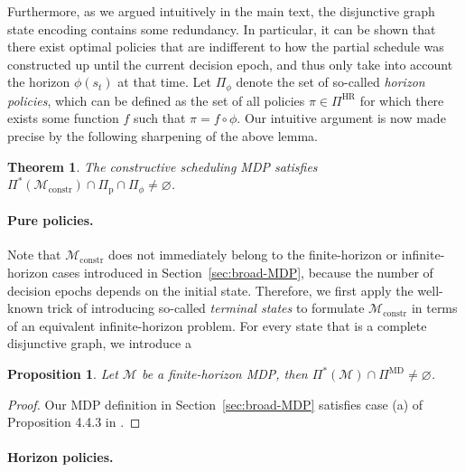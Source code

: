 \documentclass[11pt,a4paper]{article}
\newtheorem{theorem}{Theorem}[section]
\newtheorem{proposition}{Proposition}[section]
\theoremstyle{remark}
\begin{document}
Furthermore, as we argued intuitively in the main text, the disjunctive graph
state encoding contains some redundancy. In particular, it can be shown that
there exist optimal policies that are indifferent to how the partial schedule
was constructed up until the current decision epoch, and thus only take into
account the horizon $\phi(s_t)$ at that time.
%
Let $\Pi_\phi$ denote the set of so-called \emph{horizon policies}, which can be
defined as the set of all policies $\pi \in \Pi^\mathrm{HR}$ for which there
exists some function $f$ such that $\pi = f \circ \phi$.
%
Our intuitive argument is now made precise by the following sharpening of the
above lemma.

\begin{theorem}
  The constructive scheduling MDP satisfies
  $\Pi^*(\mathcal{M}_\mathrm{constr}) \cap \Pi_\mathrm{p} \cap \Pi_\phi \neq \varnothing$.

\end{theorem}

\paragraph{Pure policies.}
Note that $\mathcal{M}_\mathrm{constr}$ does not immediately belong to the
finite-horizon or infinite-horizon cases introduced in
Section~\ref{sec:broad-MDP}, because the number of decision epochs depends on
the initial state.
%
Therefore, we first apply the well-known trick of introducing so-called
\emph{terminal states} to formulate $\mathcal{M}_\mathrm{constr}$ in terms of an
equivalent infinite-horizon problem.
%
For every state that is a complete disjunctive graph, we introduce a

\begin{proposition}
  Let $\mathcal{M}$ be a finite-horizon MDP, then
  $\Pi^*(\mathcal{M}) \cap \Pi^\mathrm{MD} \neq \varnothing$.
\end{proposition}
\begin{proof}
  Our MDP definition in Section~\ref{sec:broad-MDP} satisfies case (a) of
  Proposition 4.4.3 in \cite{putermanMarkovDecisionProcesses2009}.
\end{proof}

\paragraph{Horizon policies.}
\end{document}

